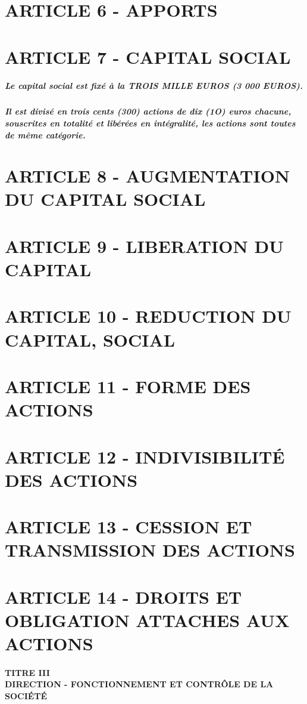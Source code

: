 \documentclass[a4paper, 11pt]{article}
\begin{document}
\section*{ARTICLE 6 - APPORTS}

\section*{ARTICLE 7 - CAPITAL SOCIAL}

\subparagraph{
  Le capital social est fixé à la TROIS MILLE EUROS (3 000 EUROS).
}

\subparagraph{
  Il est divisé en trois cents (300) actions de dix (1O) euros chacune, souscrites en totalité et libérées en intégralité, les actions sont toutes de même catégorie.
}

\section*{ARTICLE 8 - AUGMENTATION DU CAPITAL SOCIAL}

\section*{ARTICLE 9 - LIBERATION DU CAPITAL}

\section*{ARTICLE 10 - REDUCTION DU CAPITAL, SOCIAL}

\section*{ARTICLE 11 - FORME DES ACTIONS}

\section*{ARTICLE 12 - INDIVISIBILITÉ DES ACTIONS}

\section*{ARTICLE 13 - CESSION ET TRANSMISSION DES ACTIONS}

\section*{ARTICLE 14 - DROITS ET OBLIGATION ATTACHES AUX ACTIONS}

\paragraph{
  TITRE III\\
  DIRECTION - FONCTIONNEMENT ET CONTRÔLE DE LA SOCIÉTÉ
}
\end{document}
